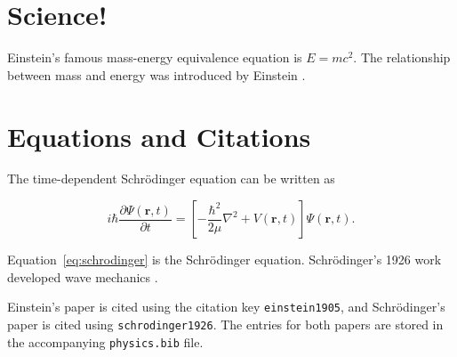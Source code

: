 \documentclass[12pt,a4paper]{article}
\begin{document}
\section{Science!}

Einstein's famous mass-energy equivalence equation is
\(E = mc^2\). The relationship between mass and energy was introduced
by Einstein \citep{einstein1905}.

\section{Equations and Citations}

The time-dependent Schr\"odinger equation can be written as

\begin{equation}
i\hbar\frac{\partial\Psi(\mathbf{r},t)}{\partial t}
=
\left[
-\frac{\hbar^2}{2\mu}\nabla^2
+V(\mathbf{r},t)
\right]\Psi(\mathbf{r},t).
\label{eq:schrodinger}
\end{equation}

Equation~\ref{eq:schrodinger} is the Schr\"odinger equation.
Schr\"odinger's 1926 work developed wave mechanics
\citep{schrodinger1926}.

Einstein's paper is cited using the citation key
\texttt{einstein1905}, and Schr\"odinger's paper is cited using
\texttt{schrodinger1926}. The entries for both papers are stored in
the accompanying \texttt{physics.bib} file.



\end{document}
